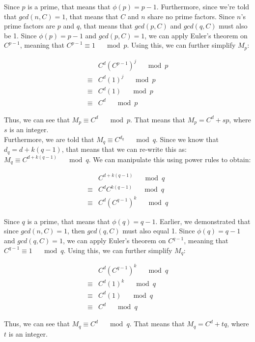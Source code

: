 \documentclass[11pt]{article}
\theoremstyle{definition}
\begin{document}
\begin{enumerate}
Since $p$ is a prime, that means that $\phi{(p)} = p - 1$. Furthermore, since we're told that $gcd(n, C) = 1$, that means that $C$ and $n$ share no prime factors. Since $n$'s prime factors are $p$ and $q$, that means that $gcd(p, C)$ and $gcd(q, C)$ must also be 1. Since $\phi{(p)} = p - 1$ and $gcd(p, C) = 1$, we can apply Euler's theorem on $C^{p - 1}$, meaning that $C^{p - 1} \equiv 1 \quad \mod{p}$. Using this, we can further simplify $M_p$:

\begin{align*}
    &C^d (C^{p-1})^j \quad \mod{p} \\
    \equiv &C^d (1)^j \quad \mod{p} \\
    \equiv &C^d (1) \quad \mod{p} \\
    \equiv &C^d \quad \mod{p}
\end{align*}

Thus, we can see that $M_p \equiv C^d \quad \mod{p}$. That means that $M_p = C^d + sp$, where $s$ is an integer. \\

Furthermore, we are told that $M_q \equiv C^{d_q} \quad \mod{q}$. Since we know that $d_q = d + k(q-1)$, that means that we can re-write this as: $M_q \equiv C^{d + k(q-1)} \quad \mod{q}$. We can manipulate this using power rules to obtain:

\begin{align*}
    &C^{d + k(q-1)} \quad \mod{q} \\
    \equiv &C^d C^{k(q-1)} \quad \mod{q} \\
    \equiv &C^d (C^{q-1})^k \quad \mod{q}
\end{align*}

Since $q$ is a prime, that means that $\phi{(q)} = q - 1$. Earlier, we demonstrated that since $gcd(n, C) = 1$, then $gcd(q, C)$ must also equal 1. Since $\phi{(q)} = q - 1$ and $gcd(q, C) = 1$, we can apply Euler's theorem on $C^{q - 1}$, meaning that $C^{q - 1} \equiv 1 \quad \mod{q}$. Using this, we can further simplify $M_q$:

\begin{align*}
    &C^d (C^{q-1})^k \quad \mod{q} \\
    \equiv &C^d (1)^k \quad \mod{q} \\
    \equiv &C^d (1) \quad \mod{q} \\
    \equiv &C^d \quad \mod{q}
\end{align*}


Thus, we can see that $M_q \equiv C^d \quad \mod{q}$. That means that $M_q = C^d + tq$, where $t$ is an integer. \\


\end{enumerate}
\end{document}
